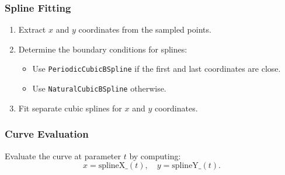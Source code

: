 \documentclass[a4paper]{article}
\begin{document}
\subsubsection{Spline Fitting}

\begin{enumerate}
    \item Extract $x$ and $y$ coordinates from the sampled points.
    \item Determine the boundary conditions for splines:
    \begin{itemize}
        \item Use \texttt{PeriodicCubicBSpline} if the first and last coordinates are close.
        \item Use \texttt{NaturalCubicBSpline} otherwise.
    \end{itemize}
    \item Fit separate cubic splines for $x$ and $y$ coordinates.
\end{enumerate}

\subsubsection{Curve Evaluation}

Evaluate the curve at parameter $t$ by computing:
\[
x = \text{splineX\_}(t), \quad y = \text{splineY\_}(t).
\]
\end{document}
